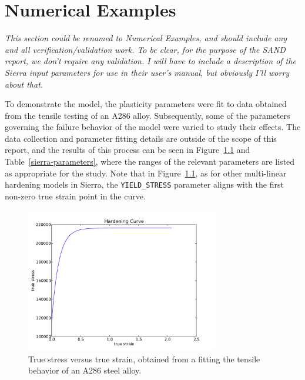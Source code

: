 \chapter{Numerical Examples}
\label{numerical-examples}

\textit{This section could be renamed to Numerical Examples, and
  should include any and all verification/validation work. To be
  clear, for the purpose of the SAND report, we don't require any
  validation. I will have to include a description of the Sierra input
  parameters for use in their user's manual, but obviously I'll worry
  about that.}

To demonstrate the model, the plasticity parameters were fit to data
obtained from the tensile testing of an A286 alloy. Subsequently, some
of the parameters governing the failure behavior of the model were
varied to study their effects. The data collection and parameter
fitting details are outside of the scope of this report, and the
results of this process can be seen in Figure~\ref{fig:hard-curve} and
Table~\ref{sierra-parameters}, where the ranges of the relevant
parameters are listed as appropriate for the study. Note that in
Figure~\ref{fig:hard-curve}, as for other multi-linear hardening
models in Sierra, the \verb!YIELD_STRESS! parameter aligns with the first
non-zero true strain point in the curve.

\begin{figure}[htbp]
  \begin{center}
    \includegraphics[trim=0mm 0mm 0mm 0 mm,clip,width=0.75\textwidth]
                    {images/hardening-curve.pdf}
    \caption{True stress versus true strain, obtained from a fitting
      the tensile behavior of an A286 steel alloy.}
    \label{fig:hard-curve}
  \end{center}
\end{figure}


